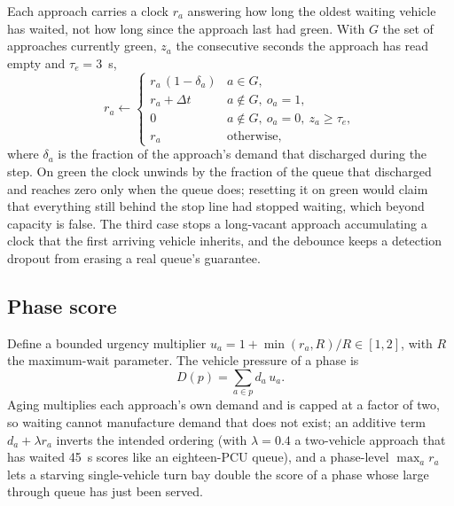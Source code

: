 \documentclass[journal]{IEEEtran}
\newcommand{\pcu}{PCU}
\begin{document}
Each approach carries a clock $r_a$ answering how long the oldest waiting vehicle has waited, not how long since
the approach last had green. With $G$ the set of approaches currently green, $z_a$ the consecutive seconds the
approach has read empty and $\tau_e = 3$~s,
\begin{equation}
r_a \leftarrow
\begin{cases}
r_a \,(1 - \delta_a) & a \in G,\\[2pt]
r_a + \Delta t & a \notin G,\ o_a = 1,\\[2pt]
0 & a \notin G,\ o_a = 0,\ z_a \geq \tau_e,\\[2pt]
r_a & \text{otherwise},
\end{cases}
\label{eq:wait}
\end{equation}
where $\delta_a$ is the fraction of the approach's demand that discharged during the step. On green the clock unwinds by the fraction of the
queue that discharged and reaches zero only when the queue does; resetting it on green would claim that
everything still behind the stop line had stopped waiting, which beyond capacity is false. The third case stops a
long-vacant approach accumulating a clock that the first arriving vehicle inherits, and the debounce keeps a
detection dropout from erasing a real queue's guarantee.

\subsection{Phase score}

Define a bounded urgency multiplier $u_a = 1 + \min(r_a, R)/R \in [1,2]$, with $R$ the maximum-wait parameter.
The vehicle pressure of a phase is
\begin{equation}
D(p) = \sum_{a \in p} d_a \, u_a .
\label{eq:vehpressure}
\end{equation}
Aging multiplies each approach's own demand and is capped at a factor of two, so waiting cannot manufacture
demand that does not exist; an additive term $d_a + \lambda r_a$ inverts the intended ordering (with
$\lambda = 0.4$ a two-vehicle approach that has waited 45~s scores like an eighteen-\pcu{} queue), and a
phase-level $\max_a r_a$ lets a starving single-vehicle turn bay double the score of a phase whose large
through queue has just been served.
\end{document}
